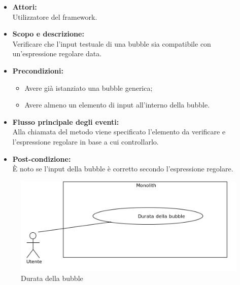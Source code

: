 \begin{itemize}
	\item \textbf{Attori:}
	\\Utilizzatore del framework.
	\item \textbf{Scopo e descrizione:} 
	\\Verificare che l'input testuale di una bubble sia compatibile con un'espressione regolare data.
	\item \textbf{Precondizioni:}
	\begin{itemize}
		\item Avere già istanziato una bubble generica;
		\item Avere almeno un elemento di input all'interno della bubble.
	\end{itemize}
	\item \textbf{Flusso principale degli eventi:}
	\\Alla chiamata del metodo viene specificato l'elemento da verificare e l'espressione regolare in base a cui controllarlo.
	\item \textbf{Post-condizione:}
	\\È noto se l'input della bubble è corretto secondo l'espressione regolare.
\end{itemize}


\begin{figure}[H]
	\centering
	\includegraphics[width=15cm]{../../documenti/AnalisiDeiRequisiti/Diagrammi_img/uc1_13.png}
	\caption{\UCCaption{} Durata della bubble}
\end{figure}

